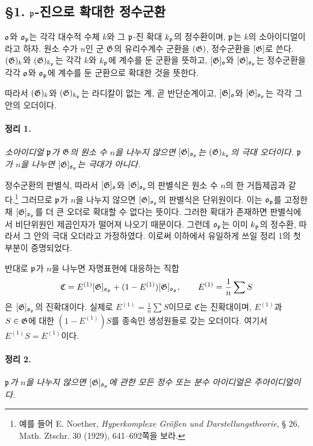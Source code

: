\subsection*{§1. \(\mathfrak p\)-진으로 확대한 정수군환}

\(\mathfrak o\)와 \(\mathfrak o_\mathfrak p\)는 각각 대수적 수체 \(k\)와 그 \(\mathfrak p\)-진 확대 \(k_\mathfrak p\)의 정수환이며, \(\mathfrak p\)는 \(k\)의 소아이디얼이라고 하자. 원소 수가 \(n\)인 군 \(\mathfrak G\)의 유리수계수 군환을 \((\mathfrak G)\), 정수군환을 \([\mathfrak G]\)로 쓴다. \((\mathfrak G)_k\)와 \((\mathfrak G)_{k_\mathfrak p}\)는 각각 \(k\)와 \(k_\mathfrak p\)에 계수를 둔 군환을 뜻하고, \([\mathfrak G]_\mathfrak o\)와 \([\mathfrak G]_{\mathfrak o_\mathfrak p}\)는 정수군환을 각각 \(\mathfrak o\)와 \(\mathfrak o_\mathfrak p\)에 계수를 둔 군환으로 확대한 것을 뜻한다.

따라서 \((\mathfrak G)_k\)와 \((\mathfrak G)_{k_\mathfrak p}\)는 라디칼이 없는 계, 곧 반단순계이고, \([\mathfrak G]_\mathfrak o\)와 \([\mathfrak G]_{\mathfrak o_\mathfrak p}\)는 각각 그 안의 오더이다.

\paragraph{정리 1.}
\emph{소아이디얼 \(\mathfrak p\)가 \(\mathfrak G\)의 원소 수 \(n\)을 나누지 않으면 \([\mathfrak G]_{\mathfrak o_\mathfrak p}\)는 \((\mathfrak G)_{k_\mathfrak p}\)의 극대 오더이다. \(\mathfrak p\)가 \(n\)을 나누면 \([\mathfrak G]_{\mathfrak o_\mathfrak p}\)는 극대가 아니다.}

정수군환의 판별식, 따라서 \([\mathfrak G]_\mathfrak o\)와 \([\mathfrak G]_{\mathfrak o_\mathfrak p}\)의 판별식은 원소 수 \(n\)의 한 거듭제곱과 같다.\footnote{예를 들어 E. Noether, \emph{Hyperkomplexe Größen und Darstellungstheorie}, § 26, Math. Ztschr. 30 (1929), 641--692쪽을 보라.} 그러므로 \(\mathfrak p\)가 \(n\)을 나누지 않으면 \([\mathfrak G]_{\mathfrak o_\mathfrak p}\)의 판별식은 단위원이다. 이는 \(\mathfrak o_\mathfrak p\)를 고정한 채 \([\mathfrak G]_{\mathfrak o_\mathfrak p}\)를 더 큰 오더로 확대할 수 없다는 뜻이다. 그러한 확대가 존재하면 판별식에서 비단위원인 제곱인자가 떨어져 나오기 때문이다. 그런데 \(\mathfrak o_\mathfrak p\)는 이미 \(k_\mathfrak p\)의 정수환, 따라서 그 안의 극대 오더라고 가정하였다. 이로써 이하에서 유일하게 쓰일 정리 1의 첫 부분이 증명되었다.

반대로 \(\mathfrak p\)가 \(n\)을 나누면 자명표현에 대응하는 직합
\[
\mathfrak C=
E^{(1)}[\mathfrak G]_{\mathfrak o_\mathfrak p}
+(1-E^{(1)})[\mathfrak G]_{\mathfrak o_\mathfrak p},
\qquad
E^{(1)}=\frac1n\sum S
\]
은 \([\mathfrak G]_{\mathfrak o_\mathfrak p}\)의 진확대이다. 실제로 \(E^{(1)}=\frac1n\sum S\)이므로 \(\mathfrak C\)는 진확대이며, \(E^{(1)}\)과 \(S\in\mathfrak G\)에 대한 \((1-E^{(1)})S\)를 종속인 생성원들로 갖는 오더이다. 여기서 \(E^{(1)}S=E^{(1)}\)이다.

\paragraph{정리 2.}
\emph{\(\mathfrak p\)가 \(n\)을 나누지 않으면 \([\mathfrak G]_{\mathfrak o_\mathfrak p}\)에 관한 모든 정수 또는 분수 아이디얼은 주아이디얼이다.}

